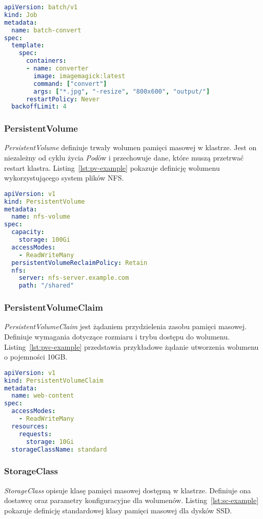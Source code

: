 \begin{lstlisting}[language=yaml,caption={Przykładowa definicja Job},label={lst:job-example}]
apiVersion: batch/v1
kind: Job
metadata:
  name: batch-convert
spec:
  template:
    spec:
      containers:
      - name: converter
        image: imagemagick:latest
        command: ["convert"]
        args: ["*.jpg", "-resize", "800x600", "output/"]
      restartPolicy: Never
  backoffLimit: 4
\end{lstlisting}

\subsubsection{PersistentVolume}
\textit{PersistentVolume} definiuje trwały wolumen pamięci masowej w klastrze.
Jest on niezależny od cyklu życia \textit{Pod}ów i przechowuje dane, które muszą przetrwać restart klastra.
Listing~\ref{lst:pv-example} pokazuje definicję wolumenu wykorzystującego system plików NFS.

\begin{lstlisting}[language=yaml,caption={Przykładowa definicja PersistentVolume},label={lst:pv-example}]
apiVersion: v1
kind: PersistentVolume
metadata:
  name: nfs-volume
spec:
  capacity:
    storage: 100Gi
  accessModes:
    - ReadWriteMany
  persistentVolumeReclaimPolicy: Retain
  nfs:
    server: nfs-server.example.com
    path: "/shared"
\end{lstlisting}

\subsubsection{PersistentVolumeClaim}
\textit{PersistentVolumeClaim} jest żądaniem przydzielenia zasobu pamięci masowej.
Definiuje wymagania dotyczące rozmiaru i trybu dostępu do wolumenu.
Listing~\ref{lst:pvc-example} przedstawia przykładowe żądanie utworzenia wolumenu o pojemności 10GB.

\begin{lstlisting}[language=yaml,caption={Przykładowa definicja PersistentVolumeClaim},label={lst:pvc-example}]
apiVersion: v1
kind: PersistentVolumeClaim
metadata:
  name: web-content
spec:
  accessModes:
    - ReadWriteMany
  resources:
    requests:
      storage: 10Gi
  storageClassName: standard
\end{lstlisting}

\subsubsection{StorageClass}
\textit{StorageClass} opisuje klasę pamięci masowej dostępną w klastrze.
Definiuje ona dostawcę oraz parametry konfiguracyjne dla wolumenów.
Listing~\ref{lst:sc-example} pokazuje definicję standardowej klasy pamięci masowej dla dysków SSD.

